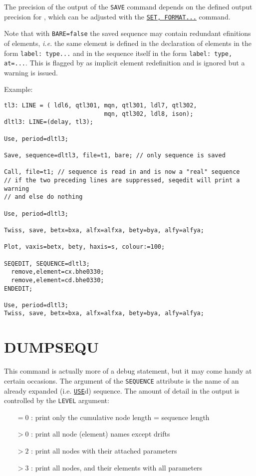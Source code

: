 The precision of the output of the \texttt{SAVE} command depends on the
defined output precision for \madx, which can be adjusted with the 
\hyperref[sec:set]{\texttt{SET, FORMAT...}} command.

 
Note that with \texttt{BARE=false} the saved sequence may contain redundant 
efinitions of elements, \textsl{i.e.} the same element is defined in the
declaration  of elements in the form \texttt{label:\ type...} and in the
sequence itself in the form \texttt{label:\ type, at=...}. This is
flagged by \madx as implicit element redefinition and is ignored but a
warning is issued.  

Example:  
\begin{verbatim}
tl3: LINE = ( ldl6, qtl301, mqn, qtl301, ldl7, qtl302,
                            mqn, qtl302, ldl8, ison);
dltl3: LINE=(delay, tl3);

Use, period=dltl3;

Save, sequence=dltl3, file=t1, bare; // only sequence is saved

Call, file=t1; // sequence is read in and is now a "real" sequence
// if the two preceding lines are suppressed, seqedit will print a warning
// and else do nothing

Use, period=dltl3;

Twiss, save, betx=bxa, alfx=alfxa, bety=bya, alfy=alfya;

Plot, vaxis=betx, bety, haxis=s, colour:=100;

SEQEDIT, SEQUENCE=dltl3;
  remove,element=cx.bhe0330;
  remove,element=cd.bhe0330;
ENDEDIT;

Use, period=dltl3;
Twiss, save, betx=bxa, alfx=alfxa, bety=bya, alfy=alfya;
\end{verbatim}


\section{DUMPSEQU}
\label{sec:dumpsequ}
This command is actually more of a debug statement, but it may come handy at certain
occasions. The argument of the \texttt{SEQUENCE} attribute is the name of an
already expanded (i.e. \hyperref[sec:use]{\texttt{USE}}d) sequence. The amount of 
detail in the output is controlled by the \texttt{LEVEL} argument:
\begin{itemize}
\item[$=0$ : ]    print only the cumulative node length = sequence length
\item[$>0$ : ]    print all node (element) names except drifts
\item[$>2$ : ]    print all nodes with their attached parameters
\item[$>3$ : ]    print all nodes, and their elements with all parameters
\end{itemize}

